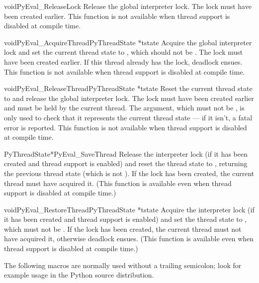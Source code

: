 \begin{cfuncdesc}{void}{PyEval_ReleaseLock}{}
  Release the global interpreter lock.  The lock must have been
  created earlier.  This function is not available when thread support
  is disabled at compile time.
\end{cfuncdesc}

\begin{cfuncdesc}{void}{PyEval_AcquireThread}{PyThreadState *tstate}
  Acquire the global interpreter lock and set the current thread
  state to , which should not be \NULL.  The lock must
  have been created earlier.  If this thread already has the lock,
  deadlock ensues.  This function is not available when thread support
  is disabled at compile time.
\end{cfuncdesc}

\begin{cfuncdesc}{void}{PyEval_ReleaseThread}{PyThreadState *tstate}
  Reset the current thread state to \NULL{} and release the global
  interpreter lock.  The lock must have been created earlier and must
  be held by the current thread.  The  argument, which
  must not be \NULL, is only used to check that it represents the
  current thread state --- if it isn't, a fatal error is reported.
  This function is not available when thread support is disabled at
  compile time.
\end{cfuncdesc}

\begin{cfuncdesc}{PyThreadState*}{PyEval_SaveThread}{}
  Release the interpreter lock (if it has been created and thread
  support is enabled) and reset the thread state to \NULL, returning
  the previous thread state (which is not \NULL).  If the lock has
  been created, the current thread must have acquired it.  (This
  function is available even when thread support is disabled at
  compile time.)
\end{cfuncdesc}

\begin{cfuncdesc}{void}{PyEval_RestoreThread}{PyThreadState *tstate}
  Acquire the interpreter lock (if it has been created and thread
  support is enabled) and set the thread state to , which
  must not be \NULL.  If the lock has been created, the current thread
  must not have acquired it, otherwise deadlock ensues.  (This
  function is available even when thread support is disabled at
  compile time.)
\end{cfuncdesc}

The following macros are normally used without a trailing semicolon;
look for example usage in the Python source distribution.

